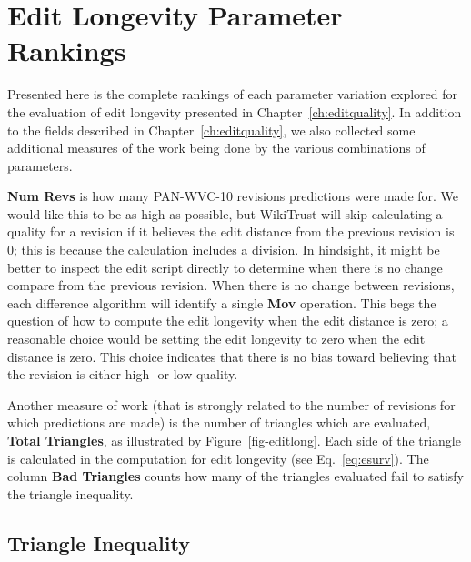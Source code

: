 \chapter{Edit Longevity Parameter Rankings}
\label{app:editlong-data}

Presented here is the complete rankings of each parameter
variation explored for the evaluation of edit longevity
presented in Chapter~\ref{ch:editquality}.
In addition to the fields described in Chapter~\ref{ch:editquality},
we also collected some additional measures of the work being
done by the various combinations of parameters.

\textbf{Num Revs} is how many PAN-WVC-10 revisions predictions
were made for.
We would like this to be as high as possible, but WikiTrust will skip
calculating a quality for a revision if it believes the edit distance
from the previous revision is 0; this is because the calculation
includes a division.
In hindsight, it might be better to inspect the edit script directly
to determine when there is no change compare from the previous revision.
When there is no change between revisions, each difference algorithm
will identify a single \textbf{Mov} operation.
This begs the question of how to compute the edit longevity when
the edit distance is zero; a reasonable choice would be setting
the edit longevity to zero when the edit distance is zero.
This choice indicates that there is no bias toward believing that
the revision is either high- or low-quality.

Another measure of work (that is strongly related to the number
of revisions for which predictions are made) is the number of
triangles which are evaluated, \textbf{Total Triangles}, as
illustrated by Figure~\ref{fig-editlong}.
Each side of the triangle is calculated in the computation
for edit longevity (see Eq.~\ref{eq:esurv}).
The column \textbf{Bad Triangles} counts how many of the
triangles evaluated fail to satisfy the triangle inequality.



\section{Triangle Inequality}


